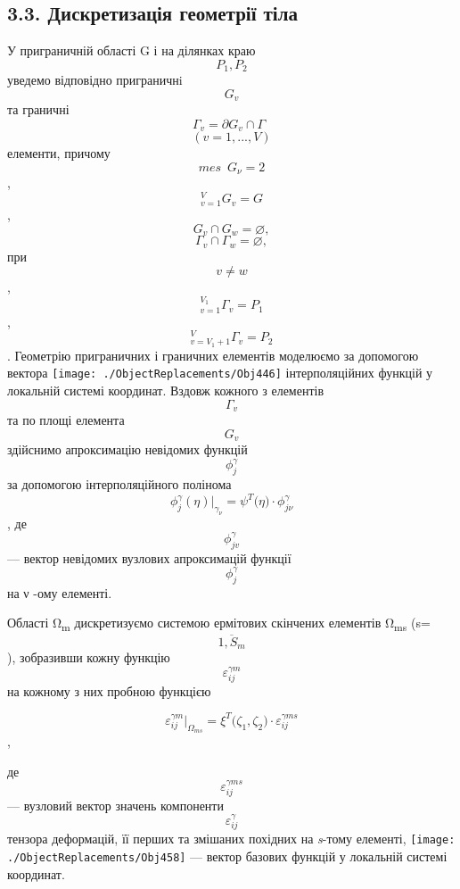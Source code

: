 \hypertarget{ux434ux438ux441ux43aux440ux435ux442ux438ux437ux430ux446ux456ux44f-ux433ux435ux43eux43cux435ux442ux440ux456ux457-ux442ux456ux43bux430}{%
\subsection[3.3. Дискретизація геометрії
тіла]{\texorpdfstring{\protect\hypertarget{anchor-48}{}{}3.3.
Дискретизація геометрії
тіла}{3.3. Дискретизація геометрії тіла}}\label{ux434ux438ux441ux43aux440ux435ux442ux438ux437ux430ux446ux456ux44f-ux433ux435ux43eux43cux435ux442ux440ux456ux457-ux442ux456ux43bux430}}

У приграничній області G і на ділянках краю
\[{P_{1},P_{2}}{}\]\textsubscript{ }уведемо відповідно пригра­нич­нi
\[G_{v}{}\] та граничні
\[{{\Gamma_{v} = \partial}{G_{v} \cap \Gamma}\mspace{9mu}}{}\]\[{({v = 1},\text{.}\text{.}\text{.},V)}{}\]\textsubscript{
}елементи, при­чому
\[{\mathit{\text{mes}}\mspace{9mu}{G_{\nu} = 2}}{}\],
\[{{}_{v = 1}^{V}{G_{v} = G}}{}\],
\[{{{G_{v} \cap G_{w}} = \varnothing},}{}\]
\[{{{\Gamma_{v} \cap \Gamma_{w}} = \varnothing},}{}\] при
\[{v \neq w}{}\], \[{{}_{v = 1}^{V_{1}}\Gamma_{v}{= P_{1}}}{}\],
\[{{}_{v = {V_{1} + 1}}^{V}\Gamma_{v}{= P_{2}}}{}\]. Геометрію
приграничних і граничних елементів моделюємо за допомогою вектора
\texttt{[image: ./ObjectReplacements/Obj446]}
інтерполяційних функцій у локальній системі координат. Вздовж кожного з
елементів \[\Gamma_{v}{}\] та по площі елемента
\[G_{v}{}\]\textsubscript{ }здійснимо апроксимацію невідомих функцій
\[\phi_{j}^{\gamma}{}\] за допомогою інтерполяційного полінома
\[{\phi_{j}^{\gamma}(\eta){|_{\gamma_{\nu}} = \psi^{T}}{(\eta{) \cdot \phi_{\mathit{j\nu}}^{\gamma}}}}{}\],
де \[\phi_{\mathit{\text{jv}}}^{\gamma}{}\] --- вектор невідомих
вузлових апроксимацій функції \[\phi_{j}^{\gamma}{}\] на ν -ому
елементі.

Області Ω\textsubscript{m} дискретизуємо системою ермітових скінчених
елементів Ω\textsubscript{ms} (s=\[\overline{1,S_{m}}{}\]), зобразивши
кожну функцію \[\varepsilon_{\mathit{\text{ij}}}^{\mathit{\gamma m}}{}\]
на кожному з них пробною функцією

\[{\varepsilon_{\mathit{\text{ij}}}^{\mathit{\gamma m}}{|_{\Omega_{\mathit{\text{ms}}}} = \xi^{T}}{(\zeta_{1}}{,\zeta_{2}}{) \cdot \varepsilon_{\mathit{\text{ij}}}^{\gamma\mathit{\text{ms}}}}}{}\],

де \[\varepsilon_{\mathit{\text{ij}}}^{\gamma\mathit{\text{ms}}}{}\] ---
вузловий вектор значень компоненти
\[\varepsilon_{\mathit{\text{ij}}}^{\gamma}{}\] тензора деформацій, її
перших та змішаних похідних на \emph{s}-тому елементі,
\texttt{[image: ./ObjectReplacements/Obj458]}
--- вектор базових функцій у локальній системі координат.

